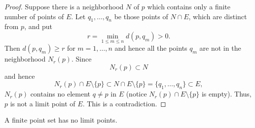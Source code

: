 \begin{proof}
Suppose there is a neighborhood $N$ of $p$ which contains only a finite number of points of $E$.
Let $q_1, \ldots , q_n$ be those points of $N \cap E$, which are distinct from $p$, and put
\[
r=\min_{1 \leq m \leq n} d(p,q_m) >0.
\]
Then $d(p,q_m) \geq r$ for $m=1, \ldots, n$ and hence all the points $q_m$ are not in the neighborhood $N_r(p)$.
Since 
\[
N_r(p) \subset N
\]
and hence
\[
N_r(p) \cap E \setminus \{p\} \subset N \cap E \setminus \{p\} = \{q_1, \ldots, q_n\} \subset E,
\]
$N_r(p)$ contains no element $q \neq p$ in $E$ (notice $N_r(p) \cap E \setminus \{p\}$ is empty).
Thus, $p$ is not a limit point of $E$. This is a contradiction.
\end{proof}
 \begin{corollary}
    A finite point set has no limit points.
 \end{corollary}

